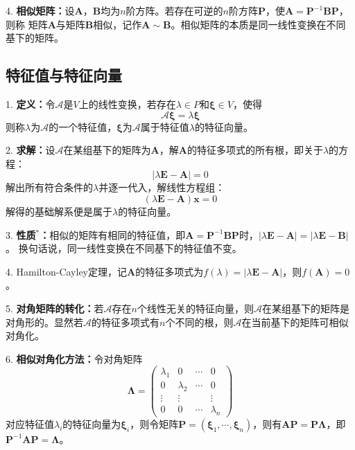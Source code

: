 4. \textbf{相似矩阵：}设$\boldsymbol{A}$，$\boldsymbol{B}$均为$n$阶方阵。若存在可逆的$n$阶方阵$\boldsymbol{P}$，使$\boldsymbol{A}=\boldsymbol{P}^{-1}\boldsymbol{BP}$，则称
矩阵$\boldsymbol{A}$与矩阵$\boldsymbol{B}$相似，记作$\boldsymbol{A}\sim\boldsymbol{B}$。相似矩阵的本质是同一线性变换在不同基下的矩阵。

\subsection{特征值与特征向量}

1. \textbf{定义：}令$\mathscr{A}$是$V$上的线性变换，若存在$\lambda \in P$和$\boldsymbol{\xi} \in V$，使得
\begin{equation*}
    \mathscr{A}\boldsymbol{\xi}=\lambda \boldsymbol{\xi}
\end{equation*}
则称$\lambda$为$\mathscr{A}$的一个特征值，$\boldsymbol{\xi}$为$\mathscr{A}$属于特征值$\lambda$的特征向量。

2. \textbf{求解：}设$\mathscr{A}$在某组基下的矩阵为$\boldsymbol{A}$，解$\boldsymbol{A}$的特征多项式的所有根，即关于$\lambda$的方程：
\begin{equation*}
    |\lambda \boldsymbol{E}-\boldsymbol{A}|=0
\end{equation*}
解出所有符合条件的$\lambda$并逐一代入，解线性方程组：
\begin{equation*}
    (\lambda \boldsymbol{E}-\boldsymbol{A})\boldsymbol{x}=0
\end{equation*}
解得的基础解系便是属于$\lambda$的特征向量。

3. \textbf{性质$^*$：}相似的矩阵有相同的特征值，即$\boldsymbol{A}=\boldsymbol{P}^{-1}\boldsymbol{B}\boldsymbol{P}$时，$|\lambda\boldsymbol{E}-\boldsymbol{A}|=|\lambda \boldsymbol{E}-\boldsymbol{B}|$。
换句话说，同一线性变换在不同基下的特征值不变。

4. Hamilton-Cayley定理，记$\boldsymbol{A}$的特征多项式为$f(\lambda)=|\lambda \boldsymbol{E}-\boldsymbol{A}|$，则$f(\boldsymbol{A})=0$。

5. \textbf{对角矩阵的转化：}若$\mathscr{A}$存在$n$个线性无关的特征向量，则$\mathscr{A}$在某组基下的矩阵是对角形的。显然若$\mathscr{A}$的特征多项式有$n$个不同的根，则$\mathscr{A}$在当前基下的矩阵可相似对角化。

6. \textbf{相似对角化方法：}令对角矩阵
\begin{equation*}
    \boldsymbol{\Lambda}=\begin{pmatrix}
        \lambda_1&0&\cdots&0\\
        0&\lambda_2&\cdots&0\\
        \vdots&\vdots&&\vdots\\
        0&0&\cdots&\lambda_n
    \end{pmatrix}
\end{equation*}
对应特征值$\lambda_i$的特征向量为$\boldsymbol{\xi}_i$，则令矩阵$\boldsymbol{P}=(\boldsymbol{\xi}_1,\cdots,\boldsymbol{\xi}_n)$，则有$\boldsymbol{A}\boldsymbol{P}=\boldsymbol{P}\boldsymbol{\Lambda}$，即$\boldsymbol{P}^{-1}\boldsymbol{A}\boldsymbol{P}=\boldsymbol{\Lambda}$。

